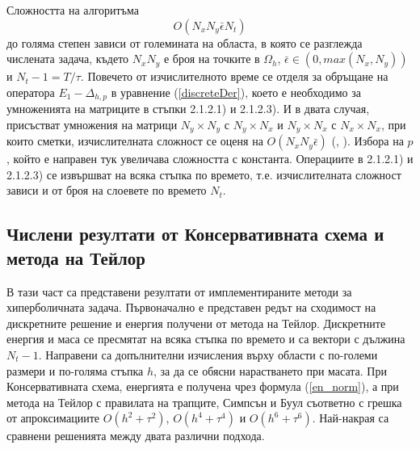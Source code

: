 \documentclass{article}
\newcommand{\rf}[1]{(\ref{#1})}
\theoremstyle{remark}
\begin{document}
Сложността на алгоритъма 
$$ O(N_x N_y \bar \epsilon N_t ) $$
до голяма степен зависи от големината на областа, в която се разглежда числената задача, където $N_x N_y$ е броя на точките в $\Omega_h$, $\bar\epsilon \in (0, max(N_x,N_y) )$ и $N_t -1= T/\tau$. Повечето от изчислителното време се отделя за обръщане на оператора $E_1-\Delta_{h,p}$ в уравнение \rf{discreteDer}, което е необходимо за умноженията на матриците в стъпки 2.1.2.1) и 2.1.2.3). И в двата случая, присъстват умножения на матрици $N_y \times N_y$ с  $N_y \times N_x$ и $N_y \times N_x$ с  $N_x \times N_x$, при които сметки, изчислителната сложност се оценя на $ O( N_x N_y \bar\epsilon)$ (\cite{ref26}, \cite{ref27}). Избора на $p$, който е направен тук увеличава сложността с константа. Операциите в 2.1.2.1) и 2.1.2.3) се извършват на всяка стъпка по времето, т.е. изчислителната сложност зависи и от броя на слоевете по времето $N_t$.

\subsection{Числени резултати от Консервативната схема и метода на Тейлор }
В тази част са представени резултати от имплементираните методи за хиперболичната задача.
Първоначално е представен редът на сходимост на дискретните решение и енергия получени от метода на Тейлор. Дискретните енергия и маса се пресмятат на всяка стъпка по времето и са вектори с дължина $N_t - 1$. Направени са допълнителни изчисления върху области с по-големи размери и по-голяма стъпка $h$, за да се обясни нарастването при масата. При Консервативната схема, енергията е получена чрез формула \rf{en_norm}, а при метода на Тейлор с правилата на трапците, Симпсън и Буул съответно с грешка от апроксимациите $O(h^{2} + \tau^2 )$, $O(h^{4} + \tau^4 )$ и $O(h^{6} + \tau^6 )$. Най-накрая са сравнени решенията между двата различни подхода. 
\end{document}
